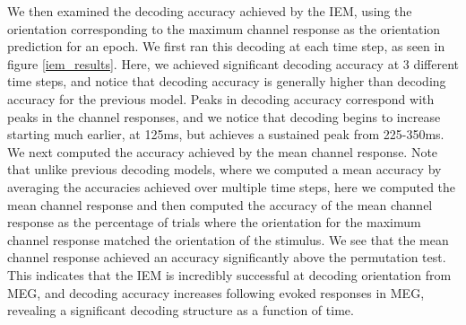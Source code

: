 \documentclass[../main.tex]{subfiles}
\begin{document}
We then examined the decoding accuracy achieved by the IEM, using the orientation corresponding to the maximum channel response as the orientation prediction for an epoch. We first ran this decoding at each time step, as seen in figure \ref{iem_results}. Here, we achieved significant decoding accuracy at 3 different time steps, and notice that decoding accuracy is generally higher than decoding accuracy for the previous model. Peaks in decoding accuracy correspond with peaks in the channel responses, and we notice that decoding begins to increase starting much earlier, at 125ms, but achieves a sustained peak from 225-350ms. We next computed the accuracy achieved by the mean channel response. Note that unlike previous decoding models, where we computed a mean accuracy by averaging the accuracies achieved over multiple time steps, here we computed the mean channel response and then computed the accuracy of the mean channel response as the percentage of trials where the orientation for the maximum channel response matched the orientation of the stimulus. We see that the mean channel response achieved an accuracy significantly above the permutation test. This indicates that the IEM is incredibly successful at decoding orientation from MEG, and decoding accuracy increases following evoked responses in MEG, revealing a significant decoding structure as a function of time.
\end{document}
